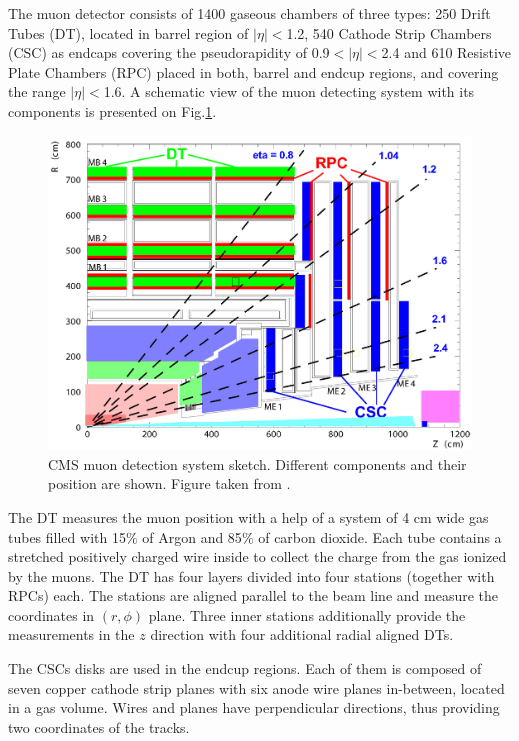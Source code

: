 The muon detector consists of 1400 gaseous chambers of three types: 250 Drift Tubes (DT), located in barrel region of $|\eta| < $1.2, 540 Cathode Strip Chambers
(CSC) as endcaps covering the pseudorapidity of 0.9$ < |\eta| < $2.4 and 610 Resistive Plate Chambers (RPC) placed in both, barrel and endcup regions, and covering
the range $|\eta| < $1.6. A schematic view of the muon detecting system with its components is presented on Fig.\ref{fig:muond}.

\begin{figure}[t]
  \centering
  \includegraphics[width=1.0\textwidth]{02_experimental_setup/plots/Figures_Experimental_Apparatus_MuonDetector.png}
  \caption{CMS muon detection system sketch. Different components and their position are shown. Figure taken from \cite{CMSatLHC}.}
  \label{fig:muond}
\end{figure}

The DT measures the muon position with a help of a system of 4 cm wide gas tubes filled with 15$\%$ of Argon and 85$\%$ of carbon dioxide.
Each tube contains a stretched positively charged wire inside to collect the charge from the gas ionized by the muons. The DT has four layers
divided into four stations (together with RPCs) each. The stations are aligned parallel to the beam line and measure the coordinates in $(r,\phi)$
plane. Three inner stations additionally provide the measurements in the $z$ direction with four additional radial aligned DTs.

The CSCs disks are used in the endcup regions. Each of them is composed of seven copper cathode strip planes with six anode wire planes in-between, located in 
a gas volume. Wires and planes have perpendicular directions, thus providing two coordinates of the tracks.

